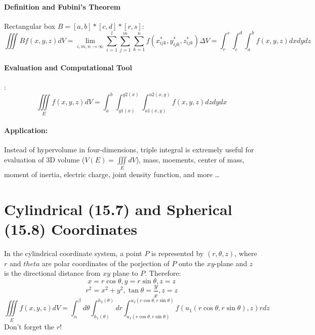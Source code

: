 \documentclass[11pt, oneside]{article}   	%
\begin{document}
\paragraph{Definition and Fubini's Theorem} Rectangular box $B = [a,b] * [c, d] * [r,s]$:
$$\iiint \limits B f(x,y,z)dV = \lim_{i,m,n\to\infty} \sum_{i=1}^l\sum_{j=1}^m\sum_{k=1}^n f(x_{ijk}^\ast, y_{ijk}^\ast,z_{ijk}^\ast)\Delta V = \int_r^s \int_c^d \int_a^b f(x,y,z) dxdydz$$
\paragraph{Evaluation and Computational Tool}:
$$\iiint \limits_E f(x,y,z)dV = \int_a^b \int_{g1(x)}^{g2(x)} \int_{u1(x,y)}^{u2(x,y)} f(x,y,z)dzdydx$$
\paragraph{Application:} Instead of hypervolume in four-dimensions, triple integral is extremely useful for evaluation of 3D volume ($V(E) = \iiint \limits_E dV$), mass, moements, center of mass, moment of inertia, electric charge, joint density function, and more \dots

\section{Cylindrical (15.7) and Spherical (15.8) Coordinates}
In the cylindrical coordinate system, a point $P$ is represented by $(r, \theta, z)$, where $r$ and $theta$ are polar coordinates of the porjection of $P$ onto the $xy$-plane and $z$ is the directional distance from $xy$ plane to $P$. Therefore: $$x=r\cos{\theta},y=r\sin{\theta},z=z$$ $$r^2 = x^2 +y^2, \tan{\theta}=\frac{y}{x}, z=z$$ $$\iiint \limits_E f(x,y,z)dV = \int_{\alpha}^{\beta}d\theta \int_{h_1(\theta)}^{h_2(\theta)} dr \int_{u_1(r\cos{\theta}, r\sin{\theta})}^{u_2(r\cos{\theta}, r\sin{\theta})} f(u_1(r\cos{\theta}, r\sin{\theta}), z)r dz$$
Don't forget the $r$!

\end{document}
